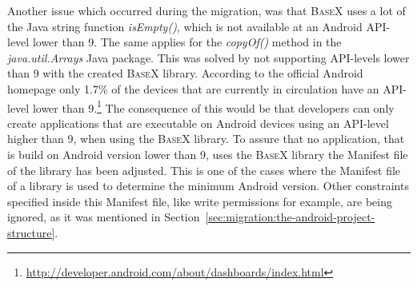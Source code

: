 Another issue which occurred during the migration, was that \textsc{BaseX} uses a lot of the Java string function \textit{isEmpty()}, which is not available at an Android API-level lower than 9.
The same applies for the \textit{copyOf()} method in the \textit{java.util.Arrays} Java package.
This was solved by not supporting API-levels lower than 9 with the created \textsc{BaseX} library.
According to the official Android homepage only 1.7\% of the devices that are currently in circulation have an API-level lower than 9.\footnote{\url{http://developer.android.com/about/dashboards/index.html}}
The consequence of this would be that developers can only create applications that are executable on Android devices using an API-level higher than 9, when using the \textsc{BaseX} library.
To assure that no application, that is build on Android version lower than 9, uses the \textsc{BaseX} library the Manifest file of the library has been adjusted.
This is one of the cases where the Manifest file of a library is used to determine the minimum Android version.
Other constraints specified inside this Manifest file, like write permissions for example, are being ignored, as it was mentioned in Section~\ref{sec:migration:the-android-project-structure}.

